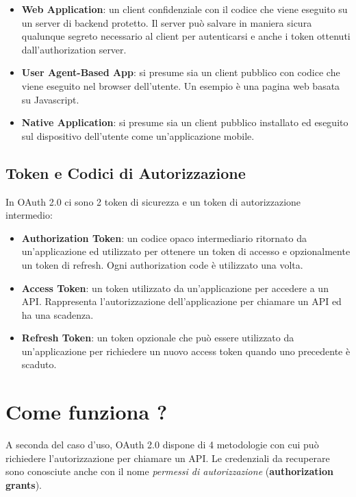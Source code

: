 \begin{itemize}
      \item \textbf{Web Application}: un client confidenziale con il codice che viene
            eseguito su un server di backend protetto. Il server può salvare in maniera
            sicura qualunque segreto necessario al client per autenticarsi e anche i
            token ottenuti dall'authorization server.
      \item \textbf{User Agent-Based App}: si presume sia un client pubblico con codice
            che viene eseguito nel browser dell'utente. Un esempio è una pagina web
            basata su Javascript.
      \item \textbf{Native Application}: si presume sia un client pubblico installato
            ed eseguito sul dispositivo dell'utente come un'applicazione mobile.
\end{itemize}

\subsection{Token e Codici di Autorizzazione}

In OAuth 2.0 ci sono 2 token di sicurezza e un token di autorizzazione intermedio:

\begin{itemize}
      \item \textbf{Authorization Token}: un codice opaco intermediario ritornato
            da un'applicazione ed utilizzato per ottenere un token di accesso e
            opzionalmente un token di refresh. Ogni authorization code è utilizzato
            una volta.
      \item \textbf{Access Token}: un token utilizzato da un'applicazione per accedere
            a un API. Rappresenta l'autorizzazione dell'applicazione per chiamare un API
            ed ha una scadenza.
      \item \textbf{Refresh Token}: un token opzionale che può essere utilizzato da
            un'applicazione per richiedere un nuovo access token quando uno precedente
            è scaduto.
\end{itemize}

\section{Come funziona ?}

A seconda del caso d'uso, OAuth 2.0 dispone di 4 metodologie con cui può richiedere
l'autorizzazione per chiamare un API. Le credenziali da recuperare sono conosciute
anche con il nome \textit{permessi di autorizzazione} (\textbf{authorization grants}).

